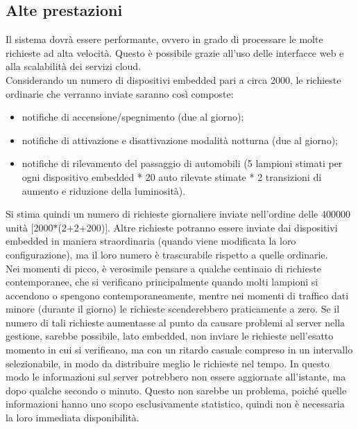 \subsection{Alte prestazioni}
Il sistema dovrà essere performante, ovvero in grado di processare le molte richieste ad alta velocità.
Questo è possibile grazie all'uso delle interfacce web e alla scalabilità dei servizi cloud.
\\Considerando un numero di dispositivi embedded pari a circa 2000, le richieste ordinarie che verranno inviate saranno così composte:
\begin{itemize}
 \item notifiche di accensione/spegnimento (due al giorno);
 \item notifiche di attivazione e disattivazione modalità notturna (due al giorno);
 \item notifiche di rilevamento del passaggio di automobili (5 lampioni stimati per ogni dispositivo embedded * 20 auto rilevate stimate * 2 transizioni di aumento e riduzione della luminosità).
\end{itemize}
Si stima quindi un numero di richieste giornaliere inviate nell'ordine delle 400000 unità [2000*(2+2+200)].
Altre richieste potranno essere inviate dai dispositivi embedded in maniera straordinaria (quando viene modificata la loro configurazione), ma il loro numero è trascurabile rispetto a quelle ordinarie.
\\Nei momenti di picco, è verosimile pensare a qualche centinaio di richieste contemporanee, che si verificano principalmente quando molti lampioni si accendono o spengono contemporaneamente, mentre nei momenti di traffico dati minore (durante il giorno) le richieste scenderebbero praticamente a zero.
Se il numero di tali richieste aumentasse al punto da causare problemi al server nella gestione, sarebbe possibile, lato embedded, non inviare le richieste nell'esatto momento in cui si verificano, ma con un ritardo casuale compreso in un intervallo selezionabile, in modo da distribuire meglio le richieste nel tempo.
In questo modo le informazioni sul server potrebbero non essere aggiornate all’istante, ma dopo qualche secondo o minuto.
Questo non sarebbe un problema, poiché quelle informazioni hanno uno scopo esclusivamente statistico, quindi non è necessaria la loro immediata disponibilità.

